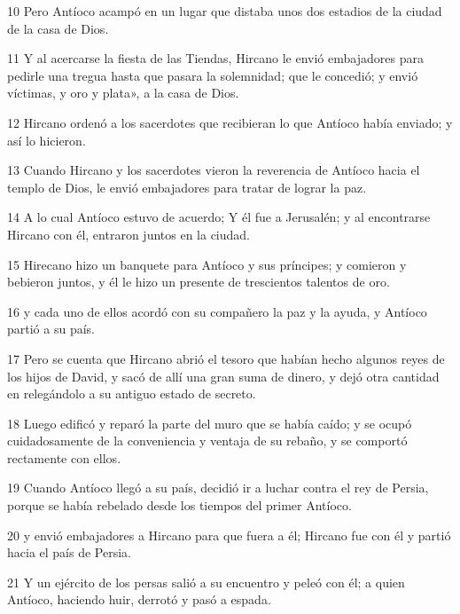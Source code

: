 \par 10 Pero Antíoco acampó en un lugar que distaba unos dos estadios de la ciudad de la casa de Dios.

\par 11 Y al acercarse la fiesta de las Tiendas, Hircano le envió embajadores para pedirle una tregua hasta que pasara la solemnidad; que le concedió; y envió víctimas, y oro y plata», a la casa de Dios.

\par 12 Hircano ordenó a los sacerdotes que recibieran lo que Antíoco había enviado; y así lo hicieron.

\par 13 Cuando Hircano y los sacerdotes vieron la reverencia de Antíoco hacia el templo de Dios, le envió embajadores para tratar de lograr la paz.

\par 14 A lo cual Antíoco estuvo de acuerdo; Y él fue a Jerusalén; y al encontrarse Hircano con él, entraron juntos en la ciudad.

\par 15 Hirecano hizo un banquete para Antíoco y sus príncipes; y comieron y bebieron juntos, y él le hizo un presente de trescientos talentos de oro.

\par 16 y cada uno de ellos acordó con su compañero la paz y la ayuda, y Antíoco partió a su país.

\par 17 Pero se cuenta que Hircano abrió el tesoro que habían hecho algunos reyes de los hijos de David, y sacó de allí una gran suma de dinero, y dejó otra cantidad en relegándolo a su antiguo estado de secreto.

\par 18 Luego edificó y reparó la parte del muro que se había caído; y se ocupó cuidadosamente de la conveniencia y ventaja de su rebaño, y se comportó rectamente con ellos.

\par 19 Cuando Antíoco llegó a su país, decidió ir a luchar contra el rey de Persia, porque se había rebelado desde los tiempos del primer Antíoco.

\par 20 y envió embajadores a Hircano para que fuera a él; Hircano fue con él y partió hacia el país de Persia.

\par 21 Y un ejército de los persas salió a su encuentro y peleó con él; a quien Antíoco, haciendo huir, derrotó y pasó a espada.


